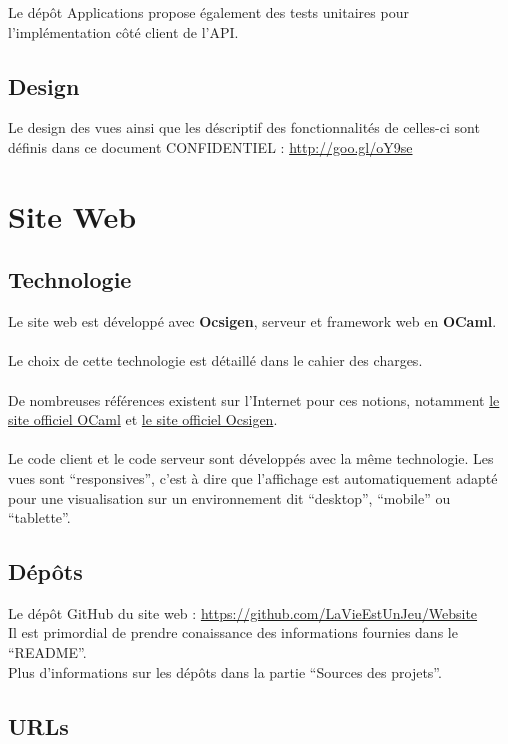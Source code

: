 \documentclass{life-fr}
\begin{document}
Le dépôt Applications propose également des tests unitaires pour l'implémentation
côté client de l'API.

\section{Design}

Le design des vues ainsi que les déscriptif des fonctionnalités de celles-ci
sont définis dans ce document CONFIDENTIEL :
\url{http://goo.gl/oY9se}


\chapter{Site Web}

\section{Technologie}

Le site web est développé avec \textbf{Ocsigen}, serveur et framework web
en \textbf{OCaml}.\\
\\
Le choix de cette technologie est détaillé dans le cahier des charges.\\
\\
De nombreuses références existent sur l'Internet pour ces notions, notamment
\href{http://ocaml.org/}{le site officiel OCaml} et
\href{http://ocsigen.org/}{le site officiel Ocsigen}.\\
\\
Le code client et le code serveur sont développés
avec la même technologie. Les vues sont ``responsives'', c'est à dire
que l'affichage est automatiquement adapté pour une visualisation sur
un environnement dit ``desktop'', ``mobile'' ou ``tablette''.

\section{Dépôts}

Le dépôt GitHub du site web :
\url{https://github.com/LaVieEstUnJeu/Website}\\
Il est primordial de prendre conaissance des informations fournies dans le
``README''.\\
Plus d'informations sur les dépôts dans la partie ``Sources des projets''.

\section{URLs}
\end{document}
